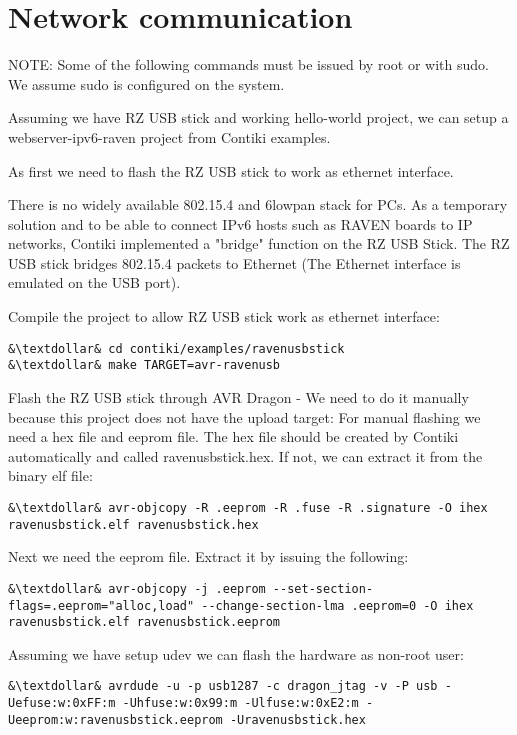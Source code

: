 \documentclass{article}
\begin{document}
\section{Network communication}
NOTE: Some of the following commands must be issued by root or with sudo. We assume sudo is configured on the system.

Assuming we have RZ USB stick and working hello-world project, we can setup a webserver-ipv6-raven project from Contiki examples.

As first we need to flash the RZ USB stick to work as ethernet interface.

There is no widely available 802.15.4 and 6lowpan stack for PCs.
As a temporary solution and to be able to connect IPv6 hosts such as RAVEN boards to IP networks,
Contiki implemented a "bridge" function on the RZ USB Stick.
The RZ USB stick bridges 802.15.4 packets to Ethernet (The Ethernet interface is emulated on the USB port).


Compile the project to allow RZ USB stick work as ethernet interface:
\begin{lstlisting}
&\textdollar& cd contiki/examples/ravenusbstick
&\textdollar& make TARGET=avr-ravenusb
\end{lstlisting}

Flash the RZ USB stick through AVR Dragon - We need to do it manually because this project does not have the upload target:
For manual flashing we need a hex file and eeprom file. The hex file should be created by Contiki automatically and called ravenusbstick.hex.
If not, we can extract it from the binary elf file:
\begin{lstlisting}
&\textdollar& avr-objcopy -R .eeprom -R .fuse -R .signature -O ihex ravenusbstick.elf ravenusbstick.hex
\end{lstlisting}
Next we need the eeprom file. Extract it by issuing the following:
\begin{lstlisting}
&\textdollar& avr-objcopy -j .eeprom --set-section-flags=.eeprom="alloc,load" --change-section-lma .eeprom=0 -O ihex ravenusbstick.elf ravenusbstick.eeprom
\end{lstlisting}
Assuming we have setup udev we can flash the hardware as non-root user:
\begin{lstlisting}
&\textdollar& avrdude -u -p usb1287 -c dragon_jtag -v -P usb -Uefuse:w:0xFF:m -Uhfuse:w:0x99:m -Ulfuse:w:0xE2:m -Ueeprom:w:ravenusbstick.eeprom -Uravenusbstick.hex
\end{lstlisting}
\end{document}
